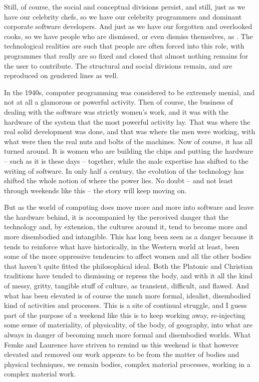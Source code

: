 {Still, of course, the social and conceptual divisions persist, and
still, just as we have our celebrity chefs, so we have our celebrity
programmers and dominant corporate software developers. And just as we
have our forgotten and overlooked cooks, so we have people who are
dismissed, or even dismiss themselves, as . The
technological realities are such that people are often forced into this
role, with programmes that really are so fixed and closed that almost
nothing remains for the user to contribute. The structural and social
divisions remain, and are reproduced on gendered lines as well. 

In the 1940s, computer programming was considered to be extremely
menial, and not at all a glamorous or powerful activity. Then of
course, the business of dealing with the software was strictly women's
work, and it was with the hardware of the system that the most powerful
activity lay. That was where the real solid development was done, and
that was where the men were working, with what were then the real nuts
and bolts of the machines. Now of course, it has all turned around. It
is women who are building the chips and putting the hardware {--} such
as it is these days {--} together, while the male expertise has shifted
to the writing of software. In only half a century, the evolution of
the technology has shifted the whole notion of where the power lies. No
doubt {--} and not least through weekends like this {--} the story will
keep moving on. 

But as the world of computing does move more and more into software and
leave the hardware behind, it is accompanied by the perceived danger
that the technology and, by extension, the cultures around it, tend to
become more and more disembodied and intangible. This has long been
seen as a danger because it tends to reinforce what have historically,
in the Western world at least, been some of the more oppressive
tendencies to affect women and all the other bodies that haven't quite
fitted the philosophical ideal. Both the Platonic and Christian
traditions have tended to dismissing or repress the body, and with it
all the kind of messy, gritty, tangible stuff of culture, as transient,
difficult, and flawed. And what has been elevated is of course the much
more formal, idealist, disembodied kind of activities and processes.
This is a site of continual struggle, and I guess part of the purpose
of a weekend like this is to keep working away, re{}-injecting some
sense of materiality, of physicality, of the body, of geography, into
what are always in danger of becoming much more formal and disembodied
worlds. What Femke and Laurence have striven to remind us this weekend
is that however elevated and removed our work appears to be from the
matter of bodies and physical techniques, we remain bodies, complex
material processes, working in a complex material work. 

}
